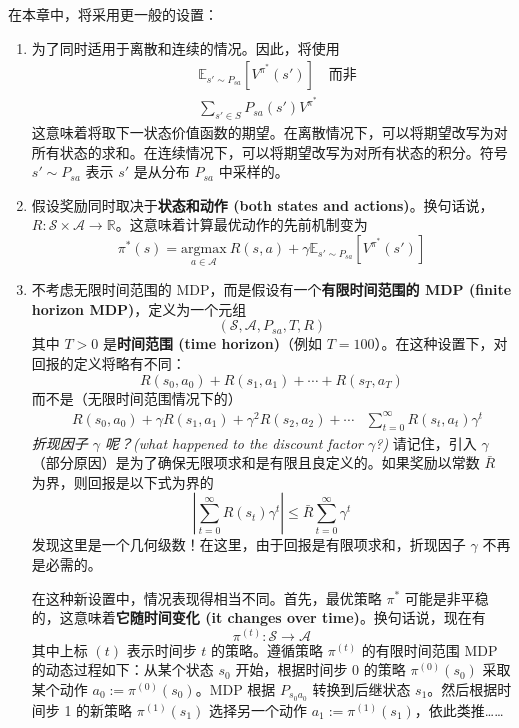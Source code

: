 在本章中，将采用更一般的设置：
\begin{enumerate}
    \item 为了同时适用于离散和连续的情况。因此，将使用
    \begin{align*}
        &\mathbb{E}_{s' \sim P_{sa}}[V^{\pi^*}(s')] \quad \text{而非} \\
        &\sum_{s' \in S} P_{sa}(s')V^{\pi^*}
    \end{align*}
    这意味着将取下一状态价值函数的期望。在离散情况下，可以将期望改写为对所有状态的求和。在连续情况下，可以将期望改写为对所有状态的积分。符号 $s' \sim P_{sa}$ 表示 $s'$ 是从分布 $P_{sa}$ 中采样的。
    \item  假设奖励同时取决于\textbf{状态和动作 (both states and actions)}。换句话说，$R: \mathcal{S} \times \mathcal{A} \to \mathbb{R}$。这意味着计算最优动作的先前机制变为
    \[
        \pi^*(s) = \underset{a \in \mathcal{A}}{\text{argmax}} \ R(s, a) + \gamma \mathbb{E}_{s' \sim P_{sa}} [V^{\pi^*}(s')]
    \]
    \item 不考虑无限时间范围的 MDP，而是假设有一个\textbf{有限时间范围的 MDP (finite horizon MDP)}，定义为一个元组
    \[
        (\mathcal{S}, \mathcal{A}, P_{sa}, T, R)
    \]
    其中 $T > 0$ 是\textbf{时间范围 (time horizon)}（例如 $T=100$）。在这种设置下，对回报的定义将略有不同：
    \[
        R(s_0, a_0) + R(s_1, a_1) + \cdots + R(s_T, a_T)
    \]
    而不是（无限时间范围情况下的）
    \begin{align*}
        & R(s_0, a_0) + \gamma R(s_1, a_1) + \gamma^2 R(s_2, a_2) + \cdots
        & \sum_{t=0}^{\infty} R(s_t, a_t)\gamma^t
    \end{align*}
    \textit{折现因子 $\gamma$ 呢？(what happened to the discount factor $\gamma$?)} 请记住，引入 $\gamma$ （部分原因）是为了确保无限项求和是有限且良定义的。如果奖励以常数 $\bar{R}$ 为界，则回报是以下式为界的
    \[
        \left| \sum_{t=0}^{\infty} R(s_t)\gamma^t \right| \leq \bar{R} \sum_{t=0}^{\infty} \gamma^t
    \]
    发现这里是一个几何级数！在这里，由于回报是有限项求和，折现因子 $\gamma$ 不再是必需的。

    在这种新设置中，情况表现得相当不同。首先，最优策略 $\pi^*$ 可能是非平稳的，这意味着\textbf{它随时间变化 (it changes over time)}。换句话说，现在有
    \[
        \pi^{(t)}: \mathcal{S} \to \mathcal{A}
    \]
    其中上标 $(t)$ 表示时间步 $t$ 的策略。遵循策略 $\pi^{(t)}$ 的有限时间范围 MDP 的动态过程如下：从某个状态 $s_0$ 开始，根据时间步 0 的策略 $\pi^{(0)}(s_0)$ 采取某个动作 $a_0 := \pi^{(0)}(s_0)$。MDP 根据 $P_{s_0 a_0}$ 转换到后继状态 $s_1$。然后根据时间步 1 的新策略 $\pi^{(1)}(s_1)$ 选择另一个动作 $a_1 := \pi^{(1)}(s_1)$，依此类推……


\end{enumerate}
